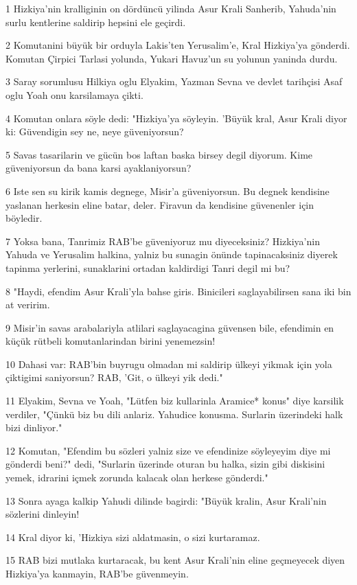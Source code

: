 \par 1 Hizkiya'nin kralliginin on dördüncü yilinda Asur Krali Sanherib, Yahuda'nin surlu kentlerine saldirip hepsini ele geçirdi.
\par 2 Komutanini büyük bir orduyla Lakis'ten Yerusalim'e, Kral Hizkiya'ya gönderdi. Komutan Çirpici Tarlasi yolunda, Yukari Havuz'un su yolunun yaninda durdu.
\par 3 Saray sorumlusu Hilkiya oglu Elyakim, Yazman Sevna ve devlet tarihçisi Asaf oglu Yoah onu karsilamaya çikti.
\par 4 Komutan onlara söyle dedi: "Hizkiya'ya söyleyin. 'Büyük kral, Asur Krali diyor ki: Güvendigin sey ne, neye güveniyorsun?
\par 5 Savas tasarilarin ve gücün bos laftan baska birsey degil diyorum. Kime güveniyorsun da bana karsi ayaklaniyorsun?
\par 6 Iste sen su kirik kamis degnege, Misir'a güveniyorsun. Bu degnek kendisine yaslanan herkesin eline batar, deler. Firavun da kendisine güvenenler için böyledir.
\par 7 Yoksa bana, Tanrimiz RAB'be güveniyoruz mu diyeceksiniz? Hizkiya'nin Yahuda ve Yerusalim halkina, yalniz bu sunagin önünde tapinacaksiniz diyerek tapinma yerlerini, sunaklarini ortadan kaldirdigi Tanri degil mi bu?
\par 8 "Haydi, efendim Asur Krali'yla bahse giris. Binicileri saglayabilirsen sana iki bin at veririm.
\par 9 Misir'in savas arabalariyla atlilari saglayacagina güvensen bile, efendimin en küçük rütbeli komutanlarindan birini yenemezsin!
\par 10 Dahasi var: RAB'bin buyrugu olmadan mi saldirip ülkeyi yikmak için yola çiktigimi saniyorsun? RAB, 'Git, o ülkeyi yik dedi."
\par 11 Elyakim, Sevna ve Yoah, "Lütfen biz kullarinla Aramice* konus" diye karsilik verdiler, "Çünkü biz bu dili anlariz. Yahudice konusma. Surlarin üzerindeki halk bizi dinliyor."
\par 12 Komutan, "Efendim bu sözleri yalniz size ve efendinize söyleyeyim diye mi gönderdi beni?" dedi, "Surlarin üzerinde oturan bu halka, sizin gibi diskisini yemek, idrarini içmek zorunda kalacak olan herkese gönderdi."
\par 13 Sonra ayaga kalkip Yahudi dilinde bagirdi: "Büyük kralin, Asur Krali'nin sözlerini dinleyin!
\par 14 Kral diyor ki, 'Hizkiya sizi aldatmasin, o sizi kurtaramaz.
\par 15 RAB bizi mutlaka kurtaracak, bu kent Asur Krali'nin eline geçmeyecek diyen Hizkiya'ya kanmayin, RAB'be güvenmeyin.
